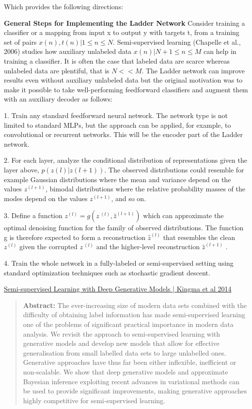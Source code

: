 \documentclass[letterpaper, 12pt]{report}
\begin{document}
Which provides the following directions: 

\textbf{General Steps for Implementing the Ladder Network} 
Consider training a classifier or a mapping from input x to output y with
targets t, from a training set of pairs ${x(n), t(n) | 1 \leq n \leq
N}$. Semi-supervised learning (Chapelle et al., 2006) studies how
auxiliary unlabeled data ${x(n) | N + 1 \leq n \leq M}$ can help in training a
classifier. It is often the case that labeled data are scarce whereas
unlabeled data are plentiful, that is $N <<  M$.  The Ladder network can
improve results even without auxiliary unlabeled data but the original
motivation was to make it possible to take well-performing feedforward
classifiers and augment them with an auxiliary decoder as follows:

1. Train any standard feedforward neural network. The network type is
not limited to standard MLPs, but the approach can be applied, for
example, to convolutional or recurrent networks. This will be the
encoder part of the Ladder network.  

2. For each layer, analyze the conditional distribution of
representations given the layer above, $p(z(l) | z (l+1))$. The
observed distributions could resemble for example Gaussian
distributions where the mean and variance depend on the values $z^{(l+1)}$, bimodal distributions where the relative probability masses of
the modes depend on the values $z^{(l+1)}$, and so on.

3. Define a function $z^{(l)} = g(z^{~(l)}, \hat{z}^{(l+1)})$ which can
approximate the optimal denoising function for the family of observed
distributions. The function g is therefore expected to form a
reconstruction $\hat{z}^{(l)}$ that resembles the clean $z^{(l)}$ given the
corrupted $z^{~(l)}$ and the higher-level reconstruction $\hat{z}^{(l+1)}$ .

4. Train the whole network in a fully-labeled or semi-supervised
setting using standard optimization techniques such as stochastic
gradient descent.

\href{https://arxiv.org/pdf/1406.5298.pdf}{Semi-supervised Learning with Deep Generative Models | Kingma et al 2014}

\begin{quote}
  \textbf{Abstract: } The ever-increasing size of modern data sets
  combined with the difficulty of obtaining label information has made
  semi-supervised learning one of the problems of significant
  practical importance in modern data analysis. We revisit the
  approach to semi-supervised learning with generative models and
  develop new models that allow for effective generalisation from
  small labelled data sets to large unlabelled ones. Generative
  approaches have thus far been either inflexible, inefficient or
  non-scalable. We show that deep generative models and approximate
  Bayesian inference exploiting recent advances in variational methods
  can be used to provide significant improvements, making generative
  approaches highly competitive for semi-supervised learning.
\end{quote}
\end{document}
